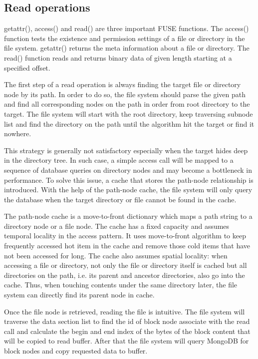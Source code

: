 \subsection{Read operations}
    getattr(), access() and read() are three important FUSE functions. The access() function tests the existence and permission settings of a file or directory in the file system. getattr() returns the meta information about a file or directory. The read() function reads and returns binary data of given length starting at a specified offset.

    The first step of a read operation is always finding the target file or directory node by its path. In order to do so, the file system should parse the given path and find all corresponding nodes on the path in order from root directory to the target. The file system will start with the root directory, keep traversing subnode list and find the directory on the path until the algorithm hit the target or find it nowhere.

    This strategy is generally not satisfactory especially when the target hides deep in the directory tree. In such case, a simple access call will be mapped to a sequence of database queries on directory nodes and may become a bottleneck in performance. To solve this issue, a cache that stores the path-node relationship is introduced. With the help of the path-node cache, the file system will only query the database when the target directory or file cannot be found in the cache.

    The path-node cache is a move-to-front dictionary which maps a path string to a directory node or a file node. The cache has a fixed capacity and assumes temporal locality in the access pattern. It uses move-to-front algorithm to keep frequently accessed hot item in the cache and remove those cold items that have not been accessed for long. The cache also assumes spatial locality: when accessing a file or directory, not only the file or directory itself is cached but all directories on the path, i.e. its parent and ancestor directories, also go into the cache. Thus, when touching contents under the same directory later, the file system can directly find its parent node in cache.

    Once the file node is retrieved, reading the file is intuitive. The file system will traverse the data section list to find the id of block node associate with the read call and calculate the begin and end index of the bytes of the block content that will be copied to read buffer. After that the file system will query MongoDB for block nodes and copy requested data to buffer.

